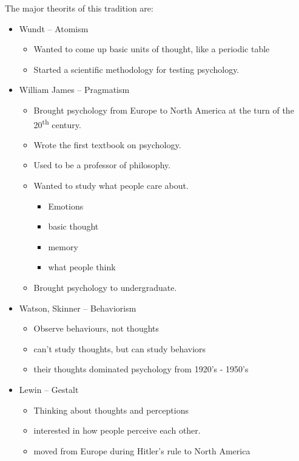 \documentclass[12pt]{article}
\begin{document}
The major theorits of this tradition are:
\begin{itemize}
    \item Wundt -- Atomism
        \begin{itemize}
            \item Wanted to come up basic units of thought, like a periodic
                table
            \item Started a scientific methodology for testing psychology.
        \end{itemize}
    \item William James -- Pragmatism
        \begin{itemize}
            \item Brought psychology from Europe to North America at the turn of
                the 20\textsuperscript{th} century.
            \item Wrote the first textbook on psychology.
            \item Used to be a professor of philosophy.
            \item Wanted to study what people care about.
                \begin{itemize}
                    \item Emotions
                    \item basic thought
                    \item memory
                    \item what people think
                \end{itemize}
            \item Brought psychology to undergraduate.
        \end{itemize}
    \item Watson, Skinner -- Behaviorism
        \begin{itemize}
            \item Observe behaviours, not thoughts
            \item can't study thoughts, but can study behaviors
            \item their thoughts dominated psychology from 1920's - 1950's
        \end{itemize}
    \item Lewin -- Gestalt
        \begin{itemize}
            \item Thinking about thoughts and perceptions
            \item interested in how people perceive each other.
            \item moved from Europe during Hitler's rule to North America
        \end{itemize}
\end{itemize}
\end{document}
